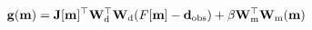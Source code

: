\begin{equation}
\mathbf{g}(\mathbf{m})=
    \mathbf{J}[\mathbf{m}]^\top \mathbf{W}_{\rm d}^\top \mathbf{W}_{\rm d}(F[\mathbf{m}]-\mathbf{d}_{\rm obs})
    + \beta \mathbf{W}_{\rm m}^\top \mathbf{W}_{\rm m} (\mathbf{m})
\label{eq:objective_function_gradient}
\end{equation}
